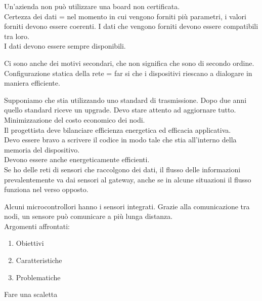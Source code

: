 \documentclass{article}
\begin{document}
    Un'azienda non può utilizzare una board non certificata.\\
    Certezza dei dati = nel momento in cui vengono forniti più parametri, i valori forniti devono essere coerenti. I dati che vengono forniti devono essere compatibili tra loro.\\
    I dati devono essere sempre disponibili.

    Ci sono anche dei motivi secondari, che non significa che sono di secondo ordine.\\
    Configurazione statica della rete = far si che i dispositivi riescano a dialogare in maniera efficiente.
    
    Supponiamo che stia utilizzando uno standard di trasmissione. Dopo due anni quello standard riceve un upgrade. Devo stare attento ad aggiornare tutto.\\
    Minimizzazione del costo economico dei nodi.\\
    Il progettista deve bilanciare efficienza energetica ed efficacia applicativa.\\
    Devo essere bravo a scrivere il codice in modo tale che stia all'interno della memoria del dispositivo.\\
    Devono essere anche energeticamente efficienti.\\
    Se ho delle reti di sensori che raccolgono dei dati, il flusso delle informazioni prevalentemente va dai sensori al gateway, anche se in alcune situazioni il flusso funziona nel verso opposto.

    Alcuni microcontrollori hanno i sensori integrati.
    Grazie alla comunicazione tra nodi, un sensore può comunicare a più lunga distanza.\\

    Argomenti affrontati:
    \begin{enumerate}
        \item Obiettivi
        \item Caratteristiche
        \item Problematiche
    \end{enumerate}

    Fare una scaletta
\end{document}
